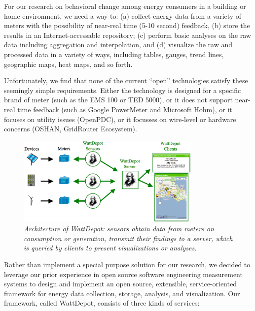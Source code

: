 \documentclass[conference,compsoc]{IEEEtran}
\begin{document}
For our research on behavioral change among energy consumers in a building
or home environment, we need a way to: (a) collect energy data from a
variety of meters with the possibility of near-real time (5-10 second)
feedback, (b) store the results in an Internet-accessable repository; (c)
perform basic analyses on the raw data including aggregation and
interpolation, and (d) visualize the raw and processed data in a variety of
ways, including tables, gauges, trend lines, geographic maps, heat maps, and so forth.

Unfortunately, we find that none of the current ``open'' technologies
satisfy these seemingly simple requirements. Either the technology is
designed for a specific brand of meter (such as the EMS 100 or TED 5000), or it does not
support near-real time feedback (such as Google PowerMeter and Microsoft
Hohm), or it focuses on utility issues (OpenPDC), or it focusses on
wire-level or hardware concerns (OSHAN, GridRouter Ecosystem).


\begin{figure}[!th]
  \center
  \includegraphics[width=0.8\textwidth]{architecture.eps}
  \caption{\em \small Architecture of WattDepot: sensors obtain data from
    meters on consumption or generation, transmit their findings to a
    server, which is queried by clients to present visualizations or analyses.}
  \label{fig:architecture}
\end{figure} 

Rather than implement a special purpose solution for our research, we
decided to leverage our prior experience in open source software
engineering measurement systems to design and implement an open source,
extensible, service-oriented framework for energy data collection, storage,
analysis, and visualization. Our framework, called WattDepot, consists of
three kinds of services:
\end{document}
